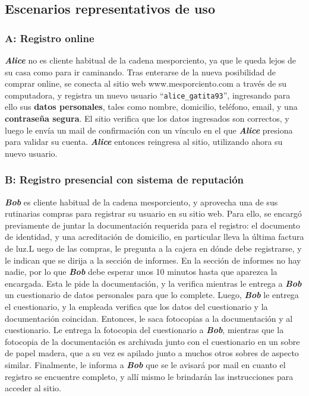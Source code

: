 \newpage
\subsection{Escenarios representativos de uso}

\subsubsection{A: Registro online}

\textbf{\emph{Alice}} no es cliente habitual de la cadena mesporciento, ya que
le queda lejos de su casa como para ir caminando. Tras enterarse de la nueva
posibilidad de comprar online, se conecta al sitio web www.mesporciento.com a
través de su computadora, y registra un nuevo usuario
``\texttt{alice\_gatita93}'', ingresando para ello sus \textbf{datos
personales}, tales como nombre, domicilio, teléfono, email, y una
\textbf{contraseña segura}. El sitio verifica que los datos ingresados son
correctos, y luego le envía un mail de confirmación con un vínculo en el que
\textbf{\emph{Alice}} presiona para validar su cuenta. \textbf{\emph{Alice}}
entonces reingresa al sitio, utilizando ahora su nuevo usuario.

\subsubsection{B: Registro presencial con sistema de reputación}

\textbf{\emph{Bob}} es cliente habitual de la cadena mesporciento, y aprovecha
una de sus rutinarias compras para registrar su usuario en su sitio web. Para
ello, se encargó previamente de juntar la documentación requerida para el
registro: el documento de identidad, y una acreditación de domicilio, en
particular lleva la última factura de luz.L uego de las compras, le pregunta a
la cajera en dónde debe registrarse, y le indican que se dirija a la sección
de informes. En la sección de informes no hay nadie, por lo que
\textbf{\emph{Bob}} debe esperar unos 10 minutos hasta que aparezca la
encargada. Esta le pide la documentación, y la verifica mientras le entrega a
\textbf{\emph{Bob}} un cuestionario de datos personales para que lo complete.
Luego, \textbf{\emph{Bob}} le entrega el cuestionario, y la empleada verifica
que los datos del cuestionario y la documentación coincidan. Entonces, le saca
fotocopias a la documentación y al cuestionario. Le entrega la fotocopia del
cuestionario a \textbf{\emph{Bob}}, mientras que la fotocopia de la
documentación es archivada junto con el cuestionario en un sobre de papel
madera, que a su vez es apilado junto a muchos otros sobres de aspecto
similar. Finalmente, le informa a \textbf{\emph{Bob}} que se le avisará por
mail en cuanto el registro se encuentre completo, y allí mismo le brindarán
las instrucciones para acceder al sitio.

